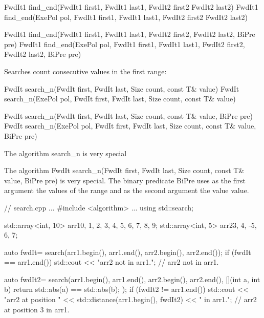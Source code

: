 \begin{cpp}
FwdIt1 find_end(FwdIt1 first1, FwdIt1 last1, FwdIt2 first2 FwdIt2 last2)
FwdIt1 find_end(ExePol pol, FwdIt1 first1, FwdIt1 last1,
				FwdIt2 first2 FwdIt2 last2)
				
FwdIt1 find_end(FwdIt1 first1, FwdIt1 last1, FwdIt2 first2, FwdIt2 last2,
				BiPre pre)
FwdIt1 find_end(ExePol pol, FwdIt1 first1, FwdIt1 last1,
				FwdIt2 first2, FwdIt2 last2, BiPre pre)
\end{cpp}

Searches count consecutive values in the first range:

\begin{cpp}
FwdIt search_n(FwdIt first, FwdIt last, Size count, const T& value)
FwdIt search_n(ExePol pol, FwdIt first, FwdIt last, Size count, const T& value)

FwdIt search_n(FwdIt first, FwdIt last, Size count, const T& value, BiPre pre)
FwdIt search_n(ExePol pol, FwdIt first,
			   FwdIt last, Size count, const T& value, BiPre pre)
\end{cpp}

\begin{myWarning}{The algorithm search\_n is very special}
	
The algorithm FwdIt search\_n(FwdIt first, FwdIt last, Size count, const T\& value, BiPre pre) is very special. The binary predicate BiPre uses as the first argument the values of the range and as the second argument the value value.
\end{myWarning}


\begin{cpp}
// search.cpp
...
#include <algorithm>
...
using std::search;

std::array<int, 10> arr1{0, 1, 2, 3, 4, 5, 6, 7, 8, 9};
std::array<int, 5> arr2{3, 4, -5, 6, 7};

auto fwdIt= search(arr1.begin(), arr1.end(), arr2.begin(), arr2.end());
if (fwdIt == arr1.end()) std::cout << "arr2 not in arr1."; // arr2 not in arr1.

auto fwdIt2= search(arr1.begin(), arr1.end(), arr2.begin(), arr2.end(),
					[](int a, int b){ return std::abs(a) == std::abs(b); });
if (fwdIt2 != arr1.end()) std::cout << "arr2 at position "
					<< std::distance(arr1.begin(), fwdIt2) << " in arr1.";
													// arr2 at position 3 in arr1.
\end{cpp}









